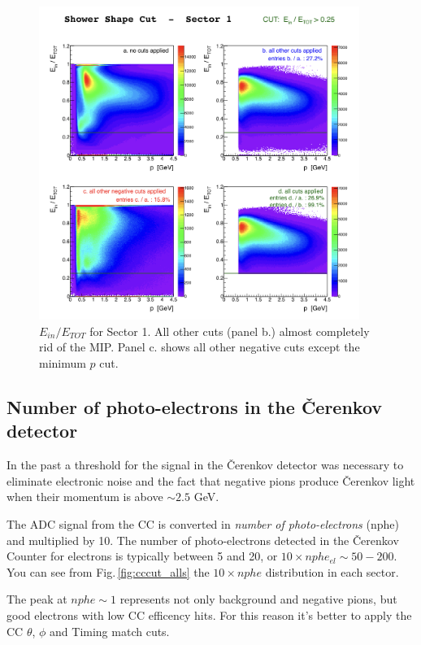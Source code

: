 \begin{figure}[h]
  \centering
		\includegraphics[width=0.93\textwidth]{img/cut-11EoOEtot_sector-1.png}
		\caption{$E_{in}/E_{TOT}$ for Sector 1. All other cuts (panel b.)
					almost completely rid of the MIP. Panel c. shows all other negative
               cuts except the minimum $p$ cut.}
 		\label{fig:einetot}
\end{figure}


\clearpage\newpage
\subsection{Number of photo-electrons in the \v Cerenkov detector}
\label{sec:cc_cut}
In the past a threshold for the signal in the \v Cerenkov detector was necessary to eliminate
electronic noise and the fact that negative pions produce \v Cerenkov light when 
their momentum is above $\sim 2.5$ GeV.

The ADC signal from the CC is converted in 
{\it number of photo-electrons} (nphe) and
multiplied by 10. The number of photo-electrons detected in the \v Cerenkov
Counter for electrons is typically between 5 and 20, or $10\times nphe_{el} \sim 50-200$.
You can see from Fig.\,\ref{fig:cccut_alls} the $10\times nphe$
distribution in each sector.

The peak at $nphe \sim 1$ represents not only background and
negative pions, but good electrons with low CC efficency hits. For this reason
it's better to apply the CC $\theta$, $\phi$ and Timing match cuts.

